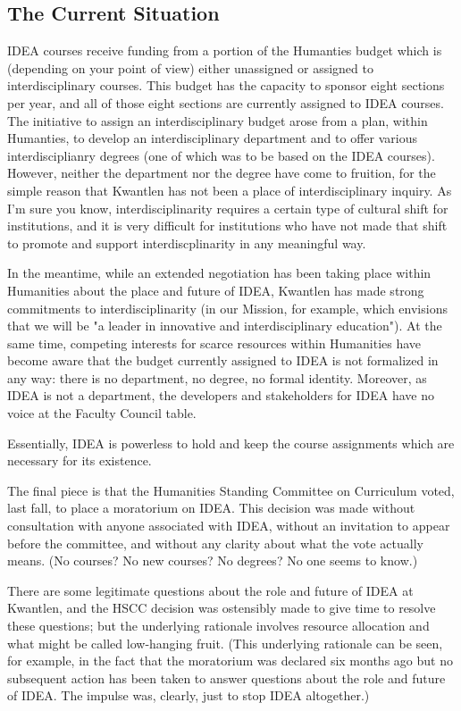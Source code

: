 \documentclass[letterpaper,10pt,headsepline]{scrreprt}
\begin{document}
\subsection{The Current Situation}

IDEA courses receive funding from a portion of the Humanties budget which is (depending on your point of view) either unassigned or assigned to interdisciplinary courses. This budget has the capacity to sponsor eight sections per year, and all of those eight sections are currently assigned to IDEA courses. The initiative to assign an interdisciplinary budget arose from a plan, within Humanties, to develop an interdisciplinary department and to offer various interdisciplianry degrees (one of which was to be based on the IDEA courses). However, neither the department nor the degree have come to fruition, for the simple reason that Kwantlen has not been a place of interdisciplinary inquiry. As I'm sure you know, interdisciplinarity requires a certain type of cultural shift for institutions, and it is very difficult for institutions who have not made that shift to promote and support interdiscplinarity in any meaningful way.

In the meantime, while an extended negotiation has been taking place within Humanities about the place and future of IDEA, Kwantlen has made strong commitments to interdisciplinarity (in our Mission, for example, which envisions that we will be "a leader in innovative and interdisciplinary education"). At the same time, competing interests for scarce resources within Humanities have become aware that the budget currently assigned to IDEA is not formalized in any way: there is no department, no degree, no formal identity. Moreover, as IDEA is not a department, the developers and stakeholders for IDEA have no voice at the Faculty Council table.

Essentially, IDEA is powerless to hold and keep the course assignments which are necessary for its existence.

The final piece is that the Humanities Standing Committee on Curriculum voted, last fall, to place a moratorium on IDEA. This decision was made without consultation with anyone associated with IDEA, without an invitation to appear before the committee, and without any clarity about what the vote actually means. (No courses? No new courses? No degrees? No one seems to know.)

There are some legitimate questions about the role and future of IDEA at Kwantlen, and the HSCC decision was ostensibly made to give time to resolve these questions; but the underlying rationale involves resource allocation and what might be called low-hanging fruit. (This underlying rationale can be seen, for example, in the fact that the moratorium was declared six months ago but no subsequent action has been taken to answer questions about the role and future of IDEA. The impulse was, clearly, just to stop IDEA altogether.)
\end{document}
